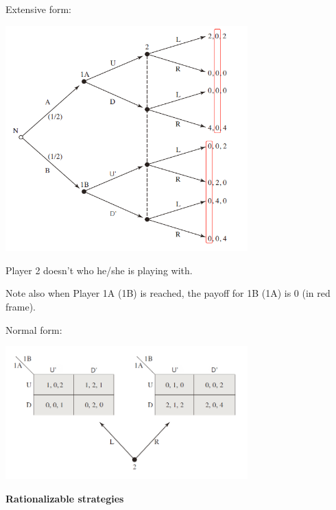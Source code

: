 \documentclass{article}
\begin{document}
\vspace{4mm}

Extensive form:

\begin{center}
\includegraphics[width=0.7\textwidth]{9.q26_3_b1}
\end{center}
\vspace{2mm}

\begin{mdframed}[backgroundcolor=blue!20,linecolor=white]
Player 2 doesn't who he/she is playing with.
\vspace{2mm}

Note also when Player 1A (1B) is reached, the payoff for 1B (1A) is 0 (in red frame).
\end{mdframed}


\vspace{4mm}

Normal form:

\begin{center}
\includegraphics[width=0.7\textwidth]{9.q26_3_b2}
\end{center}
\vspace{2mm}

\textbf{Rationalizable strategies}
\vspace{2mm}
\end{document}
